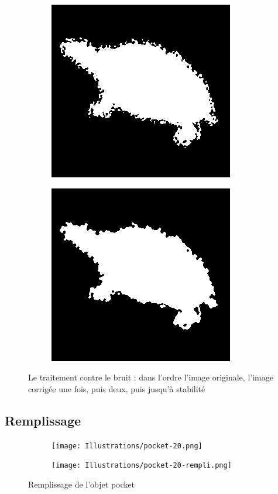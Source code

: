 \documentclass{article}
\theoremstyle{definition}
\begin{document}
\begin{figure}[!h]
\begin{subfigure}{.24\textwidth}
	    \includegraphics[scale=0.3]{Illustrations/turtle-1-bruit2.png}
	  \label{1stcup-rempli}
	  \end{subfigure}
	  \begin{subfigure}{.24\textwidth}
	    \centering
	    \includegraphics[scale=0.3]{Illustrations/turtle-1-bruitf.png}
	  \label{2ndcup-rempli}
	  \end{subfigure}
	\caption{Le traitement contre le bruit : dans l'ordre l'image originale, l'image corrigée une fois, puis deux, puis jusqu'à stabilité}
	\label{Traitement-Bruit}
    \end{figure}
    
    \subsection{Remplissage}
    \label{sec:remplissage}
    
      \begin{figure}[!h]
	\centering
	\begin{subfigure}{.25\textwidth}
	  \centering
	  \texttt{[image: Illustrations/pocket-20.png]}
	  \label{pocket-non-rempli}
	\end{subfigure}
	\begin{subfigure}{.25\textwidth}
	  \centering
	  \texttt{[image: Illustrations/pocket-20-rempli.png]}
	\label{pocket-rempli}
	\end{subfigure}
	\caption{Remplissage de l'objet pocket}
	\label{remplissage}
      \end{figure}
      
\end{document}
